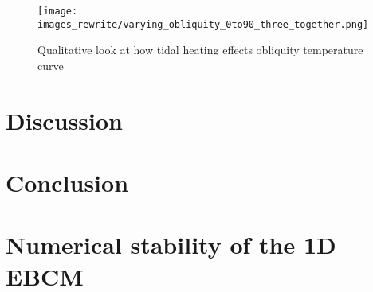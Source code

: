 \documentclass[12pt, onecolumn]{revtex4-2}    %
\begin{document}
\begin{figure}
  \texttt{[image: images\_rewrite/varying\_obliquity\_0to90\_three\_together.png]}
  \caption{
    Qualitative look at how tidal heating effects obliquity temperature curve
  }
  \label{fig:qualitative_tidalheating_obliquity}
\end{figure}

\cite{Segatz1988}
\cite{DHT2015}
\cite{RN21}




\section{Discussion} \label{sec:Discussion}

\section{Conclusion} \label{sec:Conclusion}






\clearpage

\appendix

\section{Numerical stability of the 1D EBCM} \label{appx:NumStability}
\end{document}
